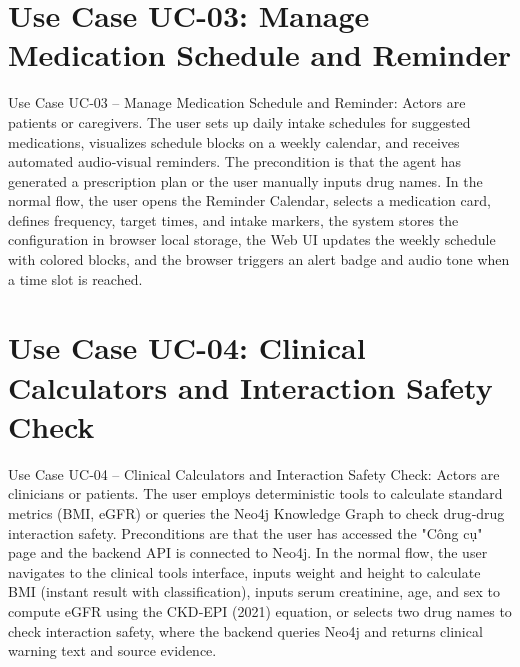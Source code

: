 \documentclass[../main.tex]{subfiles}
\begin{document}
\section{Use Case UC-03: Manage Medication Schedule and Reminder}
\label{section:uc-03}
Use Case UC‑03 – Manage Medication Schedule and Reminder: Actors are patients or caregivers. The user sets up daily intake schedules for suggested medications, visualizes schedule blocks on a weekly calendar, and receives automated audio‑visual reminders. The precondition is that the agent has generated a prescription plan or the user manually inputs drug names. In the normal flow, the user opens the Reminder Calendar, selects a medication card, defines frequency, target times, and intake markers, the system stores the configuration in browser local storage, the Web UI updates the weekly schedule with colored blocks, and the browser triggers an alert badge and audio tone when a time slot is reached.

\section{Use Case UC-04: Clinical Calculators and Interaction Safety Check}
\label{section:uc-04}
Use Case UC‑04 – Clinical Calculators and Interaction Safety Check: Actors are clinicians or patients. The user employs deterministic tools to calculate standard metrics (BMI, eGFR) or queries the Neo4j Knowledge Graph to check drug‑drug interaction safety. Preconditions are that the user has accessed the "Công cụ" page and the backend API is connected to Neo4j. In the normal flow, the user navigates to the clinical tools interface, inputs weight and height to calculate BMI (instant result with classification), inputs serum creatinine, age, and sex to compute eGFR using the CKD‑EPI (2021) equation, or selects two drug names to check interaction safety, where the backend queries Neo4j and returns clinical warning text and source evidence.
\end{document}
